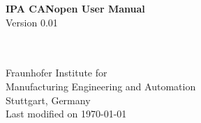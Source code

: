 \begin{titlepage}
\vspace*{13mm}
\begin{center}
  \vspace{10mm} 
         {\Large \bf IPA CANopen User Manual\\}
  \vspace{3mm}
         {  Version 0.01\\}
              

  \vspace{80mm}
  
  \makebox[40mm]{}\\
  \makebox[40mm]{}\\
  \vspace{20mm}
         {\large Fraunhofer Institute for}\\
         {\large Manufacturing Engineering and Automation} \\
         \vspace{5mm}
         {\large Stuttgart, Germany} \\
  \vfill
         {\large Last modified on \today}
\end{center}
\end{titlepage}

\clearpage
\thispagestyle{empty}
\cleardoublepage
